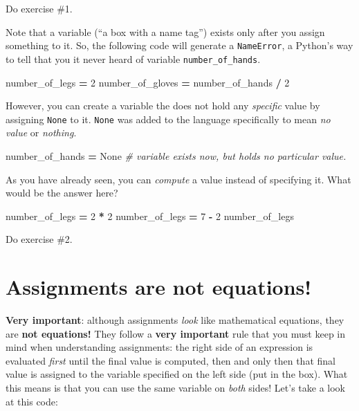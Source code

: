 \documentclass[
]{book}
\newenvironment{Shaded}{\begin{snugshade}}{\end{snugshade}}
\newcommand{\CommentTok}[1]{\textcolor[rgb]{0.56,0.35,0.01}{\textit{#1}}}
\newcommand{\DecValTok}[1]{\textcolor[rgb]{0.00,0.00,0.81}{#1}}
\newcommand{\NormalTok}[1]{#1}
\newcommand{\OperatorTok}[1]{\textcolor[rgb]{0.81,0.36,0.00}{\textbf{#1}}}
\newcommand{\VariableTok}[1]{\textcolor[rgb]{0.00,0.00,0.00}{#1}}
\begin{document}
Do exercise \#1.

Note that a variable (``a box with a name tag'') exists only after you assign something to it. So, the following code will generate a \texttt{NameError}, a Python's way to tell that you it never heard of variable \texttt{number\_of\_hands}.

\begin{Shaded}
\begin{Highlighting}[]
\NormalTok{number\_of\_legs }\OperatorTok{=} \DecValTok{2}
\NormalTok{number\_of\_gloves }\OperatorTok{=}\NormalTok{ number\_of\_hands }\OperatorTok{/} \DecValTok{2}
\end{Highlighting}
\end{Shaded}

However, you can create a variable the does not hold any \emph{specific} value by assigning \texttt{None} to it. \texttt{None} was added to the language specifically to mean \emph{no value} or \emph{nothing}.

\begin{Shaded}
\begin{Highlighting}[]
\NormalTok{number\_of\_hands }\OperatorTok{=} \VariableTok{None} \CommentTok{\# variable exists now, but holds no particular value.}
\end{Highlighting}
\end{Shaded}

As you have already seen, you can \emph{compute} a value instead of specifying it. What would be the answer here?

\begin{Shaded}
\begin{Highlighting}[]
\NormalTok{number\_of\_legs }\OperatorTok{=} \DecValTok{2} \OperatorTok{*} \DecValTok{2}
\NormalTok{number\_of\_legs }\OperatorTok{=} \DecValTok{7} \OperatorTok{{-}} \DecValTok{2}
\NormalTok{number\_of\_legs}
\end{Highlighting}
\end{Shaded}

Do exercise \#2.

\hypertarget{assignments-are-not-equations}{%
\section{Assignments are not equations!}\label{assignments-are-not-equations}}

\textbf{Very important}: although assignments \emph{look} like mathematical equations, they are \textbf{not equations!} They follow a \textbf{very important} rule that you must keep in mind when understanding assignments: the right side of an expression is evaluated \emph{first} until the final value is computed, then and only then that final value is assigned to the variable specified on the left side (put in the box). What this means is that you can use the same variable on \emph{both} sides! Let's take a look at this code:
\end{document}
